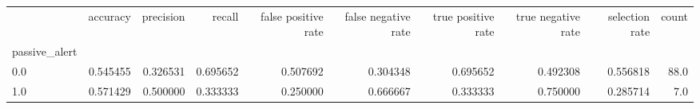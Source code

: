 \begin{tabular}{lrrrrrrrrr}
\toprule
{} &  accuracy &  precision &    recall &  false positive rate &  false negative rate &  true positive rate &  true negative rate &  selection rate &  count \\
passive\_alert &           &            &           &                      &                      &                     &                     &                 &        \\
\midrule
0.0           &  0.545455 &   0.326531 &  0.695652 &             0.507692 &             0.304348 &            0.695652 &            0.492308 &        0.556818 &   88.0 \\
1.0           &  0.571429 &   0.500000 &  0.333333 &             0.250000 &             0.666667 &            0.333333 &            0.750000 &        0.285714 &    7.0 \\
\bottomrule
\end{tabular}
